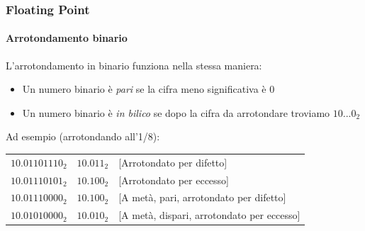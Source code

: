 \documentclass{beamer}
\begin{document}
  \begin{frame}
    \frametitle{Floating Point}
	  \framesubtitle{Arrotondamento binario}
		L'arrotondamento in binario funziona nella stessa maniera:
		\begin{itemize}
			\item Un numero binario è \emph{pari} se la cifra meno significativa è $0$
			\item Un numero binario è \emph{in bilico} se dopo la cifra da arrotondare troviamo
				$10\text{...}0_{2}$
		\end{itemize}
		\pause		
		\vspace{2em}
		Ad esempio (arrotondando all'1/8):
	    \begin{center}
	    		\begin{tabular}{ccl}
	    		$10.01101110_{2}$ & $10.011_{2}$ & [Arrotondato per difetto] \\ 
	    		$10.01110101_{2}$ & $10.100_{2}$ & [Arrotondato per eccesso] \\ 
	    		$10.01110000_{2}$ & $10.100_{2}$ & [A metà, pari, arrotondato per difetto] \\ 
	    		$10.01010000_{2}$ & $10.010_{2}$ & [A metà, dispari, arrotondato per eccesso] \\ 
	    		\end{tabular} 
	    \end{center}
  \end{frame}
\end{document}

